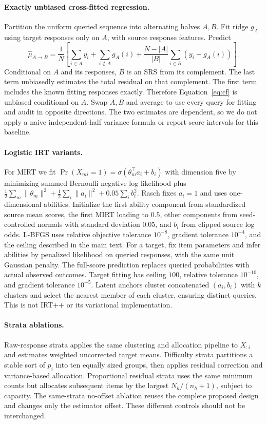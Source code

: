 \documentclass{article}
\begin{document}
\paragraph{Exactly unbiased cross-fitted regression.}
Partition the uniform queried sequence into alternating halves $A,B$. Fit ridge $g_A$ using target responses only on $A$, with source response features. Predict
\begin{equation}
\widehat\mu_{A\to B}=\frac1N\left[\sum_{i\in A}y_i+\sum_{i\notin A}g_A(i)
+\frac{N-|A|}{|B|}\sum_{i\in B}(y_i-g_A(i))\right].
\label{eq:cf}
\end{equation}
Conditional on $A$ and its responses, $B$ is an SRS from its complement. The last term unbiasedly estimates the total residual on that complement. The first term includes the known fitting responses exactly. Therefore Equation~\eqref{eq:cf} is unbiased conditional on $A$. Swap $A,B$ and average to use every query for fitting and audit in opposite directions. The two estimates are dependent, so we do not apply a naive independent-half variance formula or report score intervals for this baseline.

\paragraph{Logistic IRT variants.}
For MIRT we fit $\Pr(X_{mi}=1)=\sigma(\theta_m^\top a_i+b_i)$ with dimension five by minimizing summed Bernoulli negative log likelihood plus $\frac12\sum_m\|\theta_m\|^2+\frac12\sum_i\|a_i\|^2+0.05\sum_i b_i^2$. Rasch fixes $a_i=1$ and uses one-dimensional abilities. Initialize the first ability component from standardized source mean scores, the first MIRT loading to $0.5$, other components from seed-controlled normals with standard deviation $0.05$, and $b_i$ from clipped source log odds. L-BFGS uses relative objective tolerance $10^{-8}$, gradient tolerance $10^{-4}$, and the ceiling described in the main text. For a target, fix item parameters and infer abilities by penalized likelihood on queried responses, with the same unit Gaussian penalty. The full-score prediction replaces queried probabilities with actual observed outcomes. Target fitting has ceiling $100$, relative tolerance $10^{-10}$, and gradient tolerance $10^{-5}$. Latent anchors cluster concatenated $(a_i,b_i)$ with $k$ clusters and select the nearest member of each cluster, ensuring distinct queries. This is not IRT++ or its variational implementation.

\paragraph{Strata ablations.}
Raw-response strata applies the same clustering and allocation pipeline to $X_{:i}$ and estimates weighted uncorrected target means. Difficulty strata partitions a stable sort of $p_i$ into ten equally sized groups, then applies residual correction and variance-based allocation. Proportional residual strata uses the same minimum counts but allocates subsequent items by the largest $N_h/(n_h+1)$, subject to capacity. The same-strata no-offset ablation reuses the complete proposed design and changes only the estimator offset. These different controls should not be interchanged.
\end{document}
